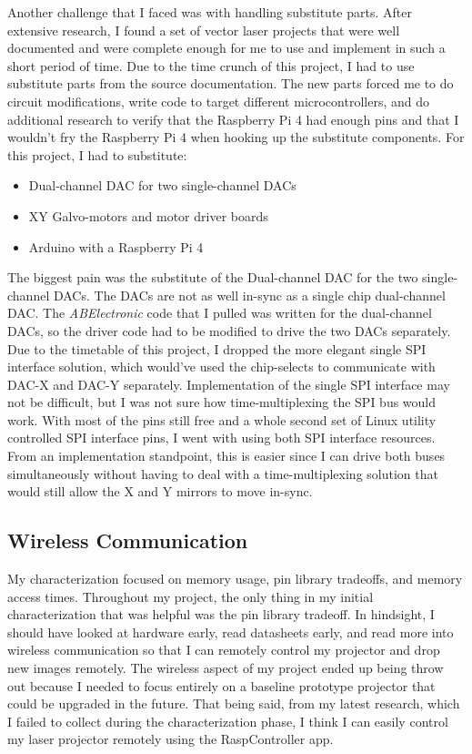 \documentclass[journal]{IEEEtran}
\begin{document}
    Another challenge that I faced was with handling substitute parts. 
    After extensive research, I found a set of vector laser projects that were well documented and were complete enough for me to use and implement in such a short period of time.
    Due to the time crunch of this project, I had to use substitute parts from the source documentation.
    The new parts forced me to do circuit modifications, write code to target different microcontrollers, and do additional research to verify that the Raspberry Pi 4 had enough pins and that I wouldn't fry the Raspberry Pi 4 when hooking up the substitute components.
    For this project, I had to substitute:
    \begin{itemize}
        \item Dual-channel DAC for two single-channel DACs
        \item XY Galvo-motors and motor driver boards
        \item Arduino with a Raspberry Pi 4
    \end{itemize} 

    The biggest pain was the substitute of the Dual-channel DAC for the two single-channel DACs. 
    The DACs are not as well in-sync as a single chip dual-channel DAC.
    The \emph{ABElectronic} code that I pulled was written for the dual-channel DACs, so the driver code had to be modified to drive the two DACs separately.
    Due to the timetable of this project, I dropped the more elegant single SPI interface solution, which would've used the chip-selects to communicate with DAC-X and DAC-Y separately.
    Implementation of the single SPI interface may not be difficult, but I was not sure how time-multiplexing the SPI bus would work.
    With most of the pins still free and a whole second set of Linux utility controlled SPI interface pins, I went with using both SPI interface resources.
    From an implementation standpoint, this is easier since I can drive both buses simultaneously without having to deal with a time-multiplexing solution that would still allow the X and Y mirrors to move in-sync.

    \subsection{Wireless Communication}
    My characterization focused on memory usage, pin library tradeoffs, and memory access times.
    Throughout my project, the only thing in my initial characterization that was helpful was the pin library tradeoff.
    In hindsight, I should have looked at hardware early, read datasheets early, and read more into wireless communication so that I can remotely control my projector and drop new images remotely.
    The wireless aspect of my project ended up being throw out because I needed to focus entirely on a baseline prototype projector that could be upgraded in the future.
    That being said, from my latest research, which I failed to collect during the characterization phase, I think I can easily control my laser projector remotely using the RaspController app.
\end{document}
